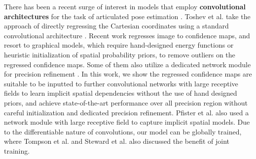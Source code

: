 \documentclass[10pt,twocolumn,letterpaper]{article}
\begin{document}
There has been a recent surge of interest in models that employ \textbf{convolutional architectures} for the task of articulated pose estimation \cite{ouyang2014multi,tompson2015cvpr,tompson2014joint,Chen_NIPS14,
carreia2015human,pishchulin2015deepcut,pfister2015flowing}. 
Toshev et al. \cite{toshev2013deeppose} take the approach of directly regressing the Cartesian coordinates using a standard convolutional architecture \cite{krizhevsky2012imagenet}.
Recent work regresses image to confidence maps, and resort to graphical models, which require hand-designed energy functions or heuristic initialization of spatial probability priors, to remove outliers on the regressed confidence maps. Some of them also utilize a dedicated network module for precision refinement \cite{tompson2015cvpr,pishchulin2015deepcut}.
%
In this work, we show the regressed confidence maps are suitable to be inputted to further convolutional networks with large receptive fields to learn implicit spatial dependencies without the use of hand designed priors, and achieve state-of-the-art performance over all precision region without careful initialization and dedicated precision refinement. Pfister et al. \cite{pfister2015flowing} also used a network module with large receptive field to capture implicit spatial models.
Due to the differentiable nature of convolutions, our model can be globally trained, where Tompson et al. \cite{tompson2014joint} and Steward et al. \cite{steward2015endtoend} also discussed the benefit of joint training.

\end{document}
